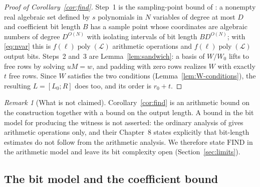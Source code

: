 \documentclass[journal]{IEEEtran}
\theoremstyle{plainn}
\theoremstyle{remark}
\newtheorem{remark}{Remark}
\begin{document}
\begin{proof}[Proof of Corollary~\ref{cor:find}]
Step~1 is the sampling-point bound of \cite[Ch.~13]{bpr06}: a nonempty real algebraic set defined by
$s$ polynomials in $N$ variables of degree at most $D$ and coefficient bit length $B$ has a sample
point whose coordinates are algebraic numbers of degree $D^{O(N)}$ with isolating intervals of bit
length $B D^{O(N)}$; with \eqref{eq:nvar} this is $f(\ell)\operatorname{poly}(\mathcal L)$ arithmetic
operations and $f(\ell)\operatorname{poly}(\mathcal L)$ output bits. Steps~2 and~3 are
Lemma~\ref{lem:sandwich}: a basis of $W/W_0$ lifts to free rows by solving $uM=w$, and padding with
zero rows realizes $W$ with exactly $t$ free rows. Since $W$ satisfies the two conditions
(Lemma~\ref{lem:W-conditions}), the resulting $L=[L_0;R]$ does too, and its order is $r_0+t$.
\end{proof}

\begin{remark}[What is not claimed]\label{rem:find-bit}
Corollary~\ref{cor:find} is an arithmetic bound on the construction together with a bound on the
output length. A bound in the bit model for producing the witness is not asserted: the ordinary
analysis of \cite{bpr06} gives arithmetic operations only, and their Chapter~8 states explicitly
that bit-length estimates do not follow from the arithmetic analysis. We therefore state
$\mathrm{FIND}$ in the arithmetic model and leave its bit complexity open
(Section~\ref{sec:limits}).
\end{remark}

\subsection{The bit model and the coefficient bound}\label{sec:bitsize}
\end{document}
